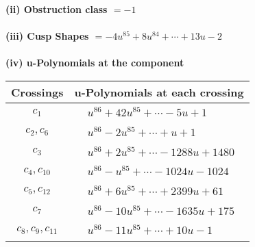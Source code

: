 \documentclass[1p]{elsarticle_modified}
\theoremstyle{definition}
\begin{document}
\flushleft \textbf{(ii) Obstruction class $= -1$}\\~\\
\flushleft \textbf{(iii) Cusp Shapes $= -4 u^{85}+8 u^{84}+\cdots+13 u-2$}\\~\\
\newpage\renewcommand{\arraystretch}{1}
\flushleft \textbf{(iv) u-Polynomials at the component}\newline \\
\begin{tabular}{m{50pt}|m{274pt}}
Crossings & \hspace{64pt}u-Polynomials at each crossing \\
\hline $$\begin{aligned}c_{1}\end{aligned}$$&$\begin{aligned}
&u^{86}+42 u^{85}+\cdots-5 u+1
\end{aligned}$\\
\hline $$\begin{aligned}c_{2},c_{6}\end{aligned}$$&$\begin{aligned}
&u^{86}-2 u^{85}+\cdots+u+1
\end{aligned}$\\
\hline $$\begin{aligned}c_{3}\end{aligned}$$&$\begin{aligned}
&u^{86}+2 u^{85}+\cdots-1288 u+1480
\end{aligned}$\\
\hline $$\begin{aligned}c_{4},c_{10}\end{aligned}$$&$\begin{aligned}
&u^{86}- u^{85}+\cdots-1024 u-1024
\end{aligned}$\\
\hline $$\begin{aligned}c_{5},c_{12}\end{aligned}$$&$\begin{aligned}
&u^{86}+6 u^{85}+\cdots+2399 u+61
\end{aligned}$\\
\hline $$\begin{aligned}c_{7}\end{aligned}$$&$\begin{aligned}
&u^{86}-10 u^{85}+\cdots-1635 u+175
\end{aligned}$\\
\hline $$\begin{aligned}c_{8},c_{9},c_{11}\end{aligned}$$&$\begin{aligned}
&u^{86}-11 u^{85}+\cdots+10 u-1
\end{aligned}$\\
\hline
\end{tabular}\\~\\
\end{document}
